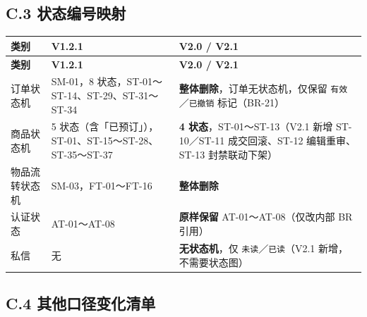 \documentclass[12pt,a4paper]{ctexart}
\begin{document}
\subsection*{C.3 状态编号映射}

{\footnotesize
\begin{longtable}{|p{2.11cm}|p{5.79cm}|p{8.11cm}|}
\hline
\textbf{类别} & \textbf{V1.2.1} & \textbf{V2.0 / V2.1} \\
\hline
\endfirsthead
\hline
\textbf{类别} & \textbf{V1.2.1} & \textbf{V2.0 / V2.1} \\
\hline
\endhead
\hline
\endfoot
订单状态机 & SM-01，8 状态，ST-01～ST-14、ST-29、ST-31～ST-34 & \textbf{整体删除}，订单无状态机，仅保留 \texttt{有效}／\texttt{已撤销} 标记（BR-21） \\
\hline
商品状态机 & 5 状态（含「已预订」），ST-01、ST-15～ST-28、ST-35～ST-37 & \textbf{4 状态}，ST-01～ST-13（V2.1 新增 ST-10／ST-11 成交回滚、ST-12 编辑重审、ST-13 封禁联动下架） \\
\hline
物品流转状态机 & SM-03，FT-01～FT-16 & \textbf{整体删除} \\
\hline
认证状态 & AT-01～AT-08 & \textbf{原样保留} AT-01～AT-08（仅改内部 BR 引用） \\
\hline
私信 & 无 & \textbf{无状态机}，仅 \texttt{未读}／\texttt{已读}（V2.1 新增，不需要状态图） \\
\hline
\end{longtable}
}


\subsection*{C.4 其他口径变化清单}
\end{document}
